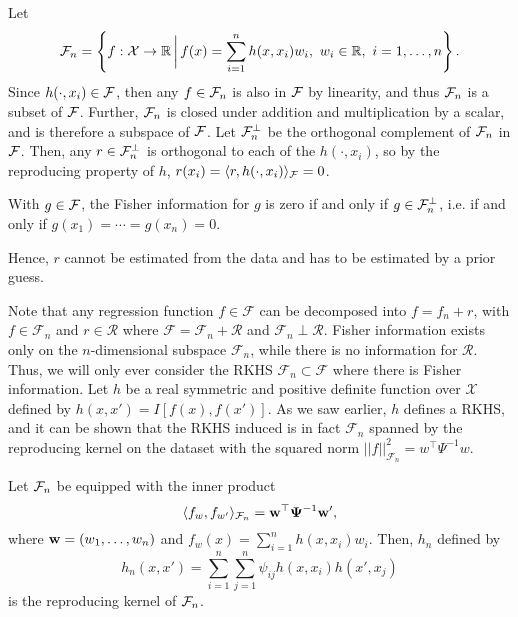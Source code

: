 Let 
\begin{align}
{\mathcal F}_n = \left\{ f:{\mathcal X} \to \mathbb{R} \, \bigg| \, f(x) = \sum_{i=1}^n h(x,x_i)w_i, \ w_i \in \mathbb{R}, \ i=1,\dots,n \right\}.  
\end{align}
Since $h(\cdot,x_i) \in {\mathcal F}$, then any $f \in {\mathcal F}_n$ is also in ${\mathcal F}$ by linearity, and thus ${\mathcal F}_n$ is a subset of ${\mathcal F}$.
Further, ${\mathcal F}_n$ is closed under addition and multiplication by a scalar, and is therefore a subspace of ${\mathcal F}$.
Let ${\mathcal F}_n^\bot$ be the orthogonal complement of ${\mathcal F}_n$ in ${\mathcal F}$.
Then, any $r \in {\mathcal F}_n^\bot$ is orthogonal to each of the $h(\cdot,x_i)$, so by the reproducing property of $h$, $r(x_i) = \langle r,h(\cdot,x_i)\rangle_{\mathcal F} = 0$.

\begin{corollary}
  With $g \in {\mathcal F}$, the Fisher information for $g$ is zero if and only if $g\in{\mathcal F}_n^\bot$, i.e. if and only if $g(x_1) = \cdots = g(x_n) = 0$.
\end{corollary}

Hence, $r$ cannot be estimated from the data and has to be estimated by a prior guess.

Note that any regression function $f\in \mathcal F$ can be decomposed into $f = f_n + r$, with $f \in \mathcal F_n$ and $r \in \mathcal R$ where $\mathcal F = \mathcal F_n + \mathcal R$ and $\mathcal F_n \perp \mathcal R$. Fisher information exists only on the $n$-dimensional subspace $\mathcal F_n$, while there is no information for $\mathcal R$. Thus, we will only ever consider the RKHS $\mathcal F_n \subset \mathcal F$ where there is Fisher information. Let $h$ be a real symmetric and positive definite function over $\mathcal X$ defined by $h(x,x') = I[f(x),f(x')]$. As we saw earlier, $h$ defines a RKHS, and it can be shown that the RKHS induced is in fact $\mathcal F_n$ spanned by the reproducing kernel on the dataset with the squared norm $||f||_{\mathcal F_n}^2 = w^\top\Psi^{-1}w$.

\begin{lemma}
  Let ${\mathcal F}_n$ be equipped with the inner product
  \[
    \langle f_w, f_{w'}\rangle_{{\mathcal F}_n} = {\mathbf w}^\top {\bm\Psi}^{-1} {\mathbf w}',
  \]
  where ${\mathbf w} = (w_1,\dots,w_n)$ and $f_w(x)=\sum_{i=1}^n h(x,x_i)w_i$.
  Then, $h_n$ defined by
  \[
    h_n(x,x') = \sum_{i=1}^n\sum_{j=1}^n \psi_{ij}h(x,x_i)h(x',x_j)
  \]
  is the reproducing kernel of ${\mathcal F}_n$.
\end{lemma}

